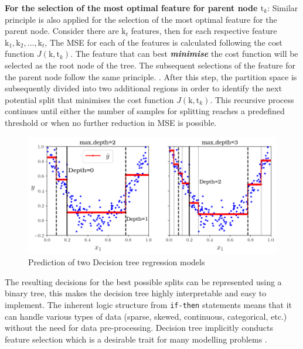 \textbf{For the selection of the most optimal feature for parent node $\text{t}_k$}: Similar principle is also applied for the selection of the most optimal feature for the parent node. Consider there are $\text{k}_t$ features, then for each respective feature $\text{k}_1,\text{k}_2,\dots,\text{k}_t$, The MSE for each of the features is calculated following the cost function $J(\text{k},\text{t}_k)$. The feature that can best \emph{\textbf{minimise}} the cost function will be selected as the root node of the tree. The subsequent selections of the feature for the parent node follow the same principle. . After this step, the partition space is subsequently divided into two additional regions in order to identify the next potential split that minimises the cost function $J(\text{k},\text{t}_k)$. This recursive process continues until either the number of samples for splitting reaches a predefined threshold or when no further reduction in MSE is possible.\\

\begin{figure}[h]
    \centering
    \includegraphics[width=.9\textwidth]{02_figures/fig6_5_partspace_geron09.png}
    \caption{Prediction of two Decision tree regression models }
    \label{fig:geron6_5}
\end{figure}

The resulting decisions for the best possible splits can be represented using a binary tree, this makes the decision tree highly interpretable and easy to implement. The inherent logic structure from {\tt if-then} statements means that it can handle various types of data (sparse, skewed, continuous, categorical, etc.) without the need for data pre-processing. Decision tree implicitly conducts feature selection which is a desirable trait for many modelling problems .\\

